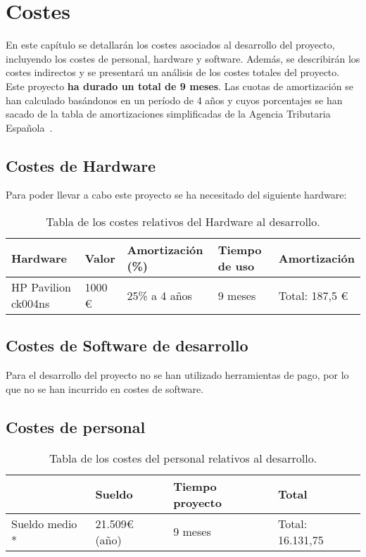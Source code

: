 \chapter{Costes}

En este capítulo se detallarán los costes asociados al desarrollo del proyecto, incluyendo los costes de personal, hardware y software. Además, se describirán los costes indirectos y se presentará un análisis de los costes totales del proyecto. Este proyecto \textbf{ha durado un total de 9 meses}. Las cuotas de amortización se han calculado basándonos en un período de 4 años y cuyos porcentajes se han sacado de la tabla de amortizaciones simplificadas de la Agencia Tributaria Española~\cite{agencia2023manual}.

\section{Costes de Hardware}

Para poder llevar a cabo este proyecto se ha necesitado del siguiente hardware:

\begin{table}[H]
  \centering
  \begin{tabular}{|l|l|l|l|l|}
    \hline
    \textbf{Hardware}   & \textbf{Valor} & \textbf{Amortización (\%)} & \textbf{Tiempo de uso} & \textbf{Amortización} \\ \hline
    HP Pavilion ck004ns & 1000 €         & 25\% a 4 años              & 9 meses                & Total: 187,5 €        \\ \hline
  \end{tabular}
  \caption{Tabla de los costes relativos del Hardware al desarrollo.}
  \label{table:1}
\end{table}

\section{Costes de Software de desarrollo}

Para el desarrollo del proyecto no se han utilizado herramientas de pago, por lo que no se han incurrido en costes de software.

\section{Costes de personal}

\begin{table}[H]
  \centering
  \begin{tabular}{|l|l|l|l|}
    \hline
                      & \textbf{Sueldo} & \textbf{Tiempo proyecto} & \textbf{Total}   \\ \hline
    Sueldo medio *    & 21.509€ (año)   & 9 meses                  & Total: 16.131,75 \\ \hline
  \end{tabular}
  \caption{Tabla de los costes del personal relativos al desarrollo.}
  \label{table:1}
\end{table}

